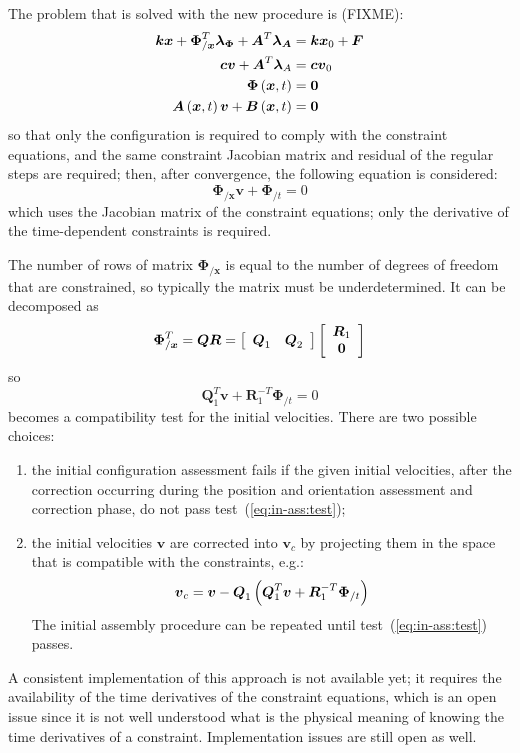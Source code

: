 \documentclass[10pt,dvips]{report}
\newcommand{\T}[1]{\boldsymbol{#1}}
\begin{document}
The problem that is solved with the new procedure is (FIXME):
\begin{align}
	\T{k} \T{x} + \T{\Phi}_{/\T{x}}^T \T{\lambda}_{\T{\Phi}} + \T{A}^T \T{\lambda}_{\T{A}} 
		& = \T{k} \T{x}_0 + \T{F} \\
	\T{c} \T{v} + \T{A}^T \T{\lambda}_{A} & = \T{c} \T{v}_0 \\
	\T{\Phi}\plbr{\T{x}, t} & = \T{0} \\
	\T{A}\plbr{\T{x}, t} \T{v} + \T{B}\plbr{\T{x}, t} & = \T{0}
\end{align}
so that only the configuration is required to comply 
with the constraint equations, and the same constraint 
Jacobian matrix and residual of the regular steps are required;
then, after convergence, the following equation is considered:
\begin{equation}
	\T{\Phi}_{/\T{x}} \T{v} + \T{\Phi}_{/t} = 0
\end{equation}
which uses the Jacobian matrix of the constraint equations; 
only the derivative of the time-dependent constraints is required.

The number of rows of matrix $\T{\Phi}_{/\T{x}}$ is equal to the number 
of degrees of freedom that are constrained, so typically the matrix 
must be underdetermined.
It can be decomposed as
\begin{equation}
	\T{\Phi}_{/\T{x}}^T = \T{Q} \T{R}
		= \sqbr{\matr{cc}{\T{Q}_1 & \T{Q}_2}}\sqbr{\cvvect{\T{R}_1 \\ \T{0}}}
\end{equation}
so
\begin{equation}
	\T{Q}_1^T \T{v} + \T{R}_1^{-T} \T{\Phi}_{/t} = 0
	\label{eq:in-ass:test}
\end{equation}
becomes a compatibility test for the initial velocities.
There are two possible choices:
\begin{enumerate}
\item the initial configuration assessment fails if the given 
initial velocities, after the correction occurring during the position 
and orientation assessment and correction phase, do not pass 
test~(\ref{eq:in-ass:test});
\item the initial velocities $\T{v}$ are corrected into $\T{v}_c$ 
by projecting them in the space that is compatible with the constraints, 
e.g.:
\begin{equation}
	\T{v}_c = \T{v} - \T{Q}_1 \plbr{\T{Q}_1^T \T{v} + \T{R}_1^{-T}\T{\Phi}_{/t}}
\end{equation}
The initial assembly procedure can be repeated until 
test~(\ref{eq:in-ass:test}) passes.
\end{enumerate}
A consistent implementation of this approach is not available yet;
it requires the availability of the time derivatives 
of the constraint equations, which is an open issue since it is not
well understood what is the physical meaning of knowing 
the time derivatives of a constraint.
Implementation issues are still open as well.
\end{document}
